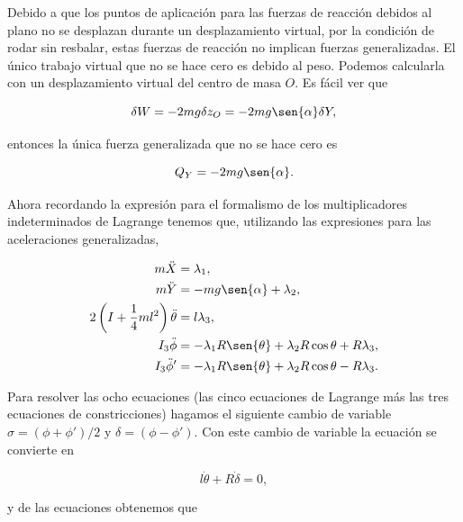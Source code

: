 \documentclass[a4paper,10pt]{article}
\numberwithin{equation}{section}
\begin{document}
\vspace{.3cm}

Debido a que los puntos de aplicación para las fuerzas de reacción 
debidos al plano no se desplazan durante un desplazamiento virtual, 
por la condición de rodar sin resbalar, estas fuerzas de reacción no 
implican fuerzas generalizadas. El único trabajo virtual que no 
se hace cero es debido al peso. Podemos calcularla con un desplazamiento 
virtual del centro de masa $O$. Es fácil ver que 

\begin{equation}
 \delta W = - 2mg \delta z_O = -2mg\sen{\alpha}\delta Y,
\end{equation}

entonces la única fuerza generalizada que no se hace cero es 

\begin{equation}
 Q_Y = -2mg\sen{\alpha}.
\end{equation}

Ahora recordando la expresión para el formalismo de los multiplicadores 
indeterminados de Lagrange tenemos que, utilizando las expresiones 
para las aceleraciones generalizadas,

\begin{align}
 \label{eq:1lagrange1}
 m\ddot{X} &= \lambda_1, \\
 \label{eq:1lagrange2}
 m\ddot{Y} &= - mg\sen{\alpha} + \lambda_2, \\
 \label{eq:1lagrange3}
 2\left( I + \frac{1}{4}ml^2\right) \ddot{\theta} &= l\lambda_3, \\
 \label{eq:1lagrange4}
 I_3\ddot{\phi} &= -\lambda_1 R\sen{\theta} + \lambda_2 R\cos{\theta} + R\lambda_3, \\
 \label{eq:1lagrange5}
 I_3\ddot{\phi}' &= -\lambda_1 R\sen{\theta} + \lambda_2 R\cos{\theta} - R\lambda_3.
\end{align}

Para resolver las ocho ecuaciones (las cinco ecuaciones de Lagrange más las tres 
ecuaciones de constricciones) hagamos el siguiente cambio de variable 
$\sigma = (\phi + \phi')/2$ y $\delta = (\phi - \phi')$. Con este cambio de variable 
la ecuación  se convierte en 

\begin{equation}
 l\dot{\theta} + R\dot{\delta} = 0,
\end{equation}

y de las ecuaciones  obtenemos que 
\end{document}
